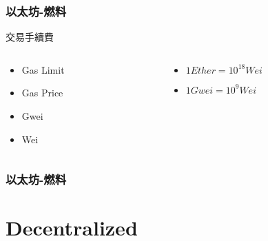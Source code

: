 \documentclass[xcolor=dvipsnames]{beamer}
\begin{document}
\begin{frame}
\frametitle{以太坊-燃料}
交易手續費
\pause
\begin{columns}
    \begin{column}{0.5\textwidth} %
\begin{block}{
\begin{itemize}
    \item Gas Limit
    \item Gas Price
    \item Gwei
    \item Wei
\end{itemize}}
\end{block}
    \end{column}
    \pause
    \begin{column}{0.5\textwidth} %
\begin{itemize}
    \item $1Ether=10^{18}Wei$
    \item $1Gwei=10^9Wei$
\end{itemize}
    \end{column}
\end{columns}
\pause
\begin{figure}
    \label{fig:gas計算}
    \end{figure}
\end{frame}
\begin{frame}
\frametitle{以太坊-燃料}
\begin{figure}
    \label{fig:gas1}
    \end{figure}
\pause
\begin{figure}
    \label{fig:gas2}
    \end{figure}
\end{frame}

\section{Decentralized}
\end{document}
